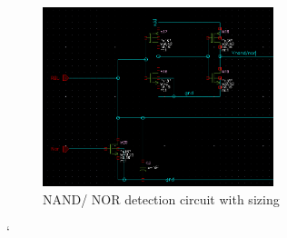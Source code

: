 \begin{figure}[h]
    \centering
    \includegraphics[width=0.6\textwidth]{nand_nor.png}
    \caption{NAND/ NOR detection circuit with sizing}
    \label{fig:mesh1}
\end{figure}
`
